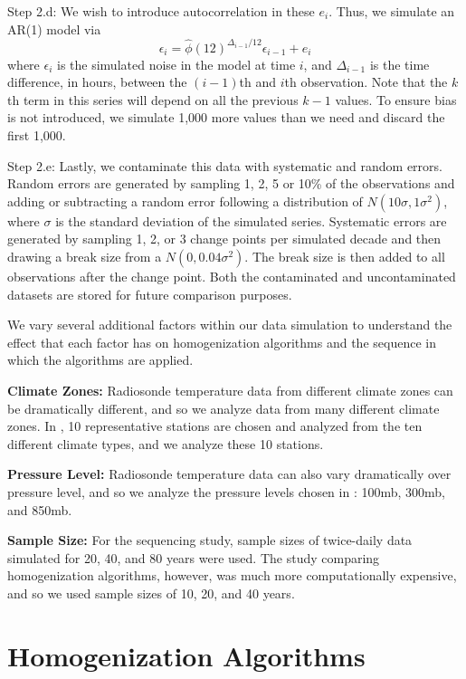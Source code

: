 \documentclass[12pt]{article}
\begin{document}
\begin{doublespacing}
Step 2.d: We wish to introduce autocorrelation in these $e_i$.  Thus, we simulate an AR(1) model via
\begin{equation*}
	\epsilon_i = \widehat{\phi}(12)^{\Delta_{i-1}/12} \epsilon_{i-1} + e_i
\end{equation*}
where $\epsilon_i$ is the simulated noise in the model at time $i$, and $\Delta_{i-1}$ is the time difference, in hours, between the $(i-1)$th and $i$th observation.  Note that the $k$th term in this series will depend on all the previous $k-1$ values.  To ensure bias is not introduced, we simulate 1,000 more values than we need and discard the first 1,000.

Step 2.e: Lastly, we contaminate this data with systematic and random errors.  Random errors are generated by sampling 1, 2, 5 or 10\% of the observations and adding or subtracting a random error following a distribution of $N(10\sigma,1\sigma^2)$, where $\sigma$ is the standard deviation of the simulated series.  Systematic errors are generated by sampling 1, 2, or 3 change points per simulated decade and then drawing a break size from a $N(0,0.04 \sigma^2)$.  The break size is then added to all observations after the change point.  Both the contaminated and uncontaminated datasets are stored for future comparison purposes.

We vary several additional factors within our data simulation to understand the effect that each factor has on homogenization algorithms and the sequence in which the algorithms are applied.

\textbf{Climate Zones:} Radiosonde temperature data from different climate zones can be dramatically different, and so we analyze data from many different climate zones.  In \cite{bell14}, 10 representative stations are chosen and analyzed from the ten different climate types, and we analyze these 10 stations.

\textbf{Pressure Level:} Radiosonde temperature data can also vary dramatically over pressure level, and so we analyze the pressure levels chosen in \cite{bell14}: 100mb, 300mb, and 850mb.

\textbf{Sample Size:}  For the sequencing study, sample sizes of twice-daily data simulated for 20, 40, and 80 years were used.  The study comparing homogenization algorithms, however, was much more computationally expensive, and so we used sample sizes of 10, 20, and 40 years.

\section{Homogenization Algorithms}


\end{doublespacing}
\end{document}
